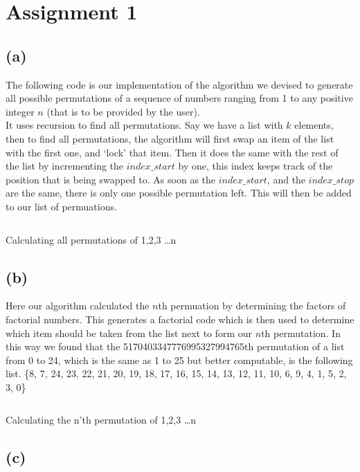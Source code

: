\documentclass[a4paper,12px]{article}
\begin{document}
\section{Assignment 1}
\subsection{(a)}
The following code is our implementation of the algorithm we devised to generate all possible permutations
of a sequence of numbers ranging from 1 to any positive integer $n$ (that is to be provided by the user).\\
It uses recursion to find all permutations. Say we have a list with $k$ elements, then to find all permutations,
the algorithm will first swap an item of the list with the first one, and `lock' that item. Then it does the
same with the rest of the list by incrementing the $index\_start$ by one, this index keeps track of the
position that is being swapped to. As soon as the $index\_start$, and the $index\_stop$ are the
 same, there is only one possible permutation left. This will then be added to
 our list of permuations.

\begin{listing}[H]
\inputminted{python}{1a.py}
\caption{Calculating all permutations of 1,2,3 \ldots n}
\end{listing}

\subsection{(b)} Here our algorithm calculated the $n$th permuation by
determining the factors of factorial numbers. This generates a factorial code
which is then used to determine which item should be taken from the list next to
form our $n$th permutation.  In this way we found that the
5170403347776995327994765th permutation of a list from 0 to 24, which is the
same as 1 to 25 but better computable, is the following list. \{8, 7,
    24, 23, 22, 21, 20, 19, 18, 17, 16, 15, 14, 13, 12, 11, 10, 6, 9, 4, 1, 5,
    2, 3, 0\}

\begin{listing}[H]
\inputminted{python}{1b.py}
\caption{Calculating the n'th permutation of 1,2,3 \ldots n}
\end{listing}

\subsection{(c)}
\end{document}
